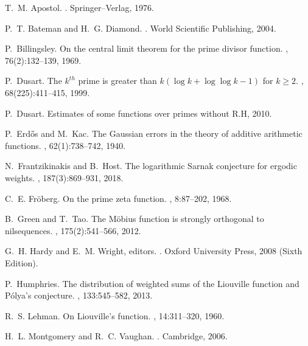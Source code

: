 \documentclass[11pt,reqno,a4letter]{article}
\numberwithin{equation}{section}
\numberwithin{figure}{section}
\numberwithin{table}{section}
\theoremstyle{plain}
\numberwithin{theorem}{section}
\theoremstyle{definition}
\begin{document}
\begin{thebibliography}{10}

T.~M. Apostol.
.
\newblock Springer--Verlag, 1976.

P.~T. Bateman and H.~G. Diamond.
.
\newblock World Scientific Publishing, 2004.

P.~Billingsley.
\newblock On the central limit theorem for the prime divisor function.
, 76(2):132--139, 1969.

P.~Dusart.
\newblock The $k^{th}$ prime is greater than $k(\log k +\log\log k-1)$ for $k
  \geq 2$.
, 68(225):411--415, 1999.

P.~Dusart.
\newblock Estimates of some functions over primes without {R}.{H}, 2010.

P.~Erd{\H{o}}s and M.~Kac.
\newblock The {G}aussian errors in the theory of additive arithmetic functions.
, 62(1):738--742, 1940.

N.~Frantzikinakis and B.~Host.
\newblock The logarithmic {S}arnak conjecture for ergodic weights.
, 187(3):869--931, 2018.

C.~E. Fr{\"{o}}berg.
\newblock On the prime zeta function.
, 8:87--202, 1968.

B.~Green and T.~Tao.
\newblock The {M}\"{o}bius function is strongly orthogonal to nilsequences.
, 175(2):541--566, 2012.

G.~H. Hardy and E.~M. Wright, editors.
.
\newblock Oxford University Press, 2008 (Sixth Edition).

P.~Humphries.
\newblock The distribution of weighted sums of the {L}iouville function and
  {P}\'{o}lya's conjecture.
, 133:545--582, 2013.

R.~S. Lehman.
\newblock On {L}iouville's function.
, 14:311--320, 1960.

H.~L. Montgomery and R.~C. Vaughan.
.
\newblock Cambridge, 2006.


\end{thebibliography}
\end{document}
